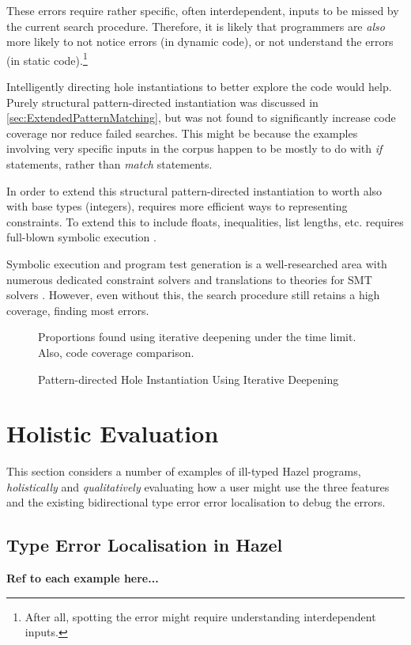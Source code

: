 These errors require rather specific, often interdependent, inputs to be missed by the current search procedure. Therefore, it is likely that programmers are \textit{also} more likely to not notice errors (in dynamic code), or not understand the errors (in static code).\footnote{After all, spotting the error might require understanding interdependent inputs.}

Intelligently directing hole instantiations to better explore the code would help. Purely structural pattern-directed instantiation was discussed in \cref{sec:ExtendedPatternMatching}, but was not found to significantly increase code coverage nor reduce failed searches. This might be because the examples involving very specific inputs in the corpus happen to be mostly to do with \textit{if} statements, rather than \textit{match} statements.

In order to extend this structural pattern-directed instantiation to worth also with base types (integers), requires more efficient ways to representing constraints. To extend this to include floats, inequalities, list lengths, etc. requires full-blown symbolic execution \cite{SymbolicExecutionSurvey}. 

Symbolic execution and program test generation is a well-researched area with numerous dedicated constraint solvers \cite{CITE MANY HERE} and translations to theories for SMT solvers \cite{CITE}. However, even without this, the search procedure still retains a high coverage, finding most errors.

\begin{figure}\centering
Proportions found using iterative deepening under the time limit. Also, code coverage comparison.
\caption{Pattern-directed Hole Instantiation Using Iterative Deepening}
\end{figure}

\section{Holistic Evaluation}
\label{sec:HolisticEvaluation}

This section considers a number of examples of ill-typed Hazel programs, \textit{holistically} and \textit{qualitatively} evaluating how a user might use the three features and the existing bidirectional type error error localisation \cite{HazelErrors} to debug the errors. 


\subsection{Type Error Localisation in Hazel}
\textbf{Ref to each example here...}

